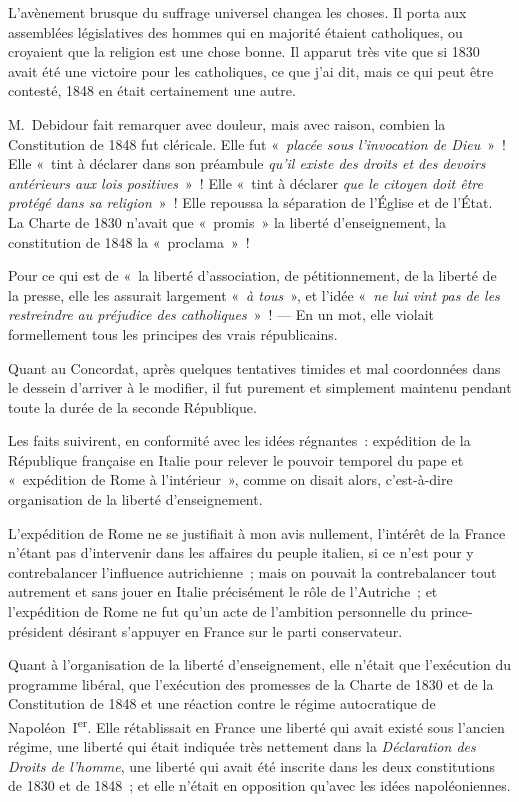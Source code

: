 \documentclass[french,twoside]{book} %
\begin{document}
\noindent L’avènement brusque du suffrage universel changea les choses. Il porta aux assemblées législatives des hommes qui en majorité étaient catholiques, ou croyaient que la religion est une chose bonne. Il apparut très vite que si 1830 avait été une victoire pour les catholiques, ce que j’ai dit, mais ce qui peut être contesté, 1848 en était certainement une autre.\par
M. Debidour fait remarquer avec douleur, mais avec raison, combien la Constitution de 1848 fut cléricale. Elle fut « {\itshape placée sous l’invocation de Dieu} » ! Elle « tint à déclarer dans son préambule {\itshape qu’il existe des droits et des devoirs antérieurs aux lois positives} » ! Elle « tint à déclarer {\itshape que le citoyen doit être protégé dans sa religion} » ! Elle repoussa la séparation de l’Église et de l’État. La Charte de 1830 n’avait que « promis » la liberté  d’enseignement, la constitution de 1848 la « proclama » !\par
Pour ce qui est de « la liberté d’association, de pétitionnement, de la liberté de la presse, elle les assurait largement « {\itshape à tous} », et l’idée « {\itshape ne lui vint pas de les restreindre au préjudice des catholiques} » ! — En un mot, elle violait formellement tous les principes des vrais républicains.\par
Quant au Concordat, après quelques tentatives timides et mal coordonnées dans le dessein d’arriver à le modifier, il fut purement et simplement maintenu pendant toute la durée de la seconde République.\par
Les faits suivirent, en conformité avec les idées régnantes : expédition de la République française en Italie pour relever le pouvoir temporel du pape et « expédition de Rome à l’intérieur », comme on disait alors, c’est-à-dire organisation de la liberté d’enseignement.\par
L’expédition de Rome ne se justifiait à mon avis nullement, l’intérêt de la France n’étant pas d’intervenir dans les affaires du peuple italien, si ce n’est pour y contrebalancer l’influence autrichienne ; mais on pouvait la contrebalancer tout autrement et sans jouer en Italie précisément le rôle de l’Autriche ; et l’expédition de Rome ne fut qu’un acte de l’ambition personnelle du prince-président  désirant s’appuyer en France sur le parti conservateur.\par
Quant à l’organisation de la liberté d’enseignement, elle n’était que l’exécution du programme libéral, que l’exécution des promesses de la Charte de 1830 et de la Constitution de 1848 et une réaction contre le régime autocratique de Napoléon I\textsuperscript{er}. Elle rétablissait en France une liberté qui avait existé sous l’ancien régime, une liberté qui était indiquée très nettement dans la \emph{Déclaration des Droits de l’homme}, une liberté qui avait été inscrite dans les deux constitutions de 1830 et de 1848 ; et elle n’était en opposition qu’avec les idées napoléoniennes.\par
\end{document}
